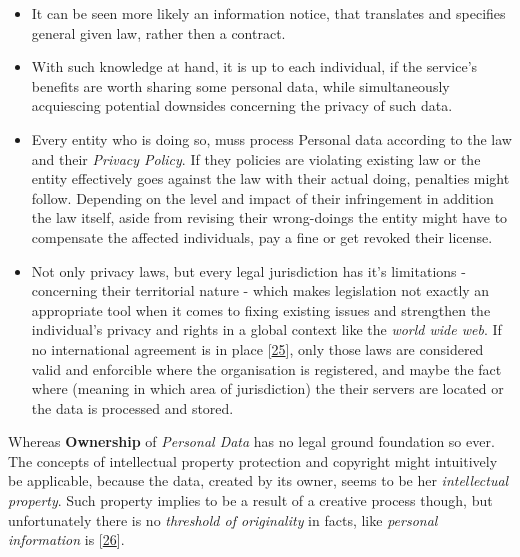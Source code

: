 \documentclass[12pt,english,a4paper,titlepage,cleardoublepage=empty,dottedtoc]{report}
\renewcommand{\href}[2]{#2\footnote{\url{#1}}}
\begin{document}
\begin{itemize}
  A user commonly agrees on the privacy policy, by starting to interact
  with the author's business, thus every \emph{Privacy Policy} is
  required to be publicly accessible; e.g. before creating an account.
  \textgreater{} By clicking Create an account, you agree to our
  \href{https://www.facebook.com/legal/terms}{Terms} \textgreater{} and
  that you have read our
  \href{https://www.facebook.com/about/privacy}{Data Policy}, including
  \textgreater{} our
  \href{https://www.facebook.com/policies/cookies/}{Cookie Use}.
  \textgreater{}
  \emph{{[}web\_2016\_facebooks-landing-page\_policy-acknowledgement{]}}
\item
  It can be seen more likely an information notice, that translates and
  specifies general given law, rather then a contract.
\item
  With such knowledge at hand, it is up to each individual, if the
  service's benefits are worth sharing some personal data, while
  simultaneously acquiescing potential downsides concerning the privacy
  of such data.
\item
  Every entity who is doing so, muss process Personal data according to
  the law and their \emph{Privacy Policy}. If they policies are
  violating existing law or the entity effectively goes against the law
  with their actual doing, penalties might follow. Depending on the
  level and impact of their infringement in addition the law itself,
  aside from revising their wrong-doings the entity might have to
  compensate the affected individuals, pay a fine or get revoked their
  license.
\item
  Not only privacy laws, but every legal jurisdiction has it's
  limitations - concerning their territorial nature - which makes
  legislation not exactly an appropriate tool when it comes to fixing
  existing issues and strengthen the individual's privacy and rights in
  a global context like the \emph{world wide web}. If no international
  agreement is in place
  {[}\protect\hyperlink{ref-web_2016_international-privacy-standards}{25}{]},
  only those laws are considered valid and enforcible where the
  organisation is registered, and maybe the fact where (meaning in which
  area of jurisdiction) the their servers are located or the data is
  processed and stored.
\end{itemize}

Whereas \textbf{Ownership} of \emph{Personal Data} has no legal ground
foundation so ever. The concepts of intellectual property protection and
copyright might intuitively be applicable, because the data, created by
its owner, seems to be her \emph{intellectual property}. Such property
implies to be a result of a creative process though, but unfortunately
there is no \emph{threshold of originality} in facts, like
\emph{personal information} is
{[}\protect\hyperlink{ref-paper_2014_who-owns-yours-data}{26}{]}.
\end{document}
